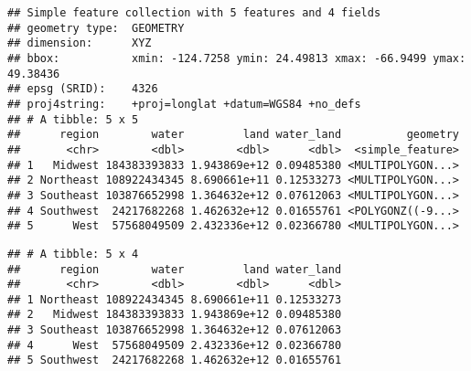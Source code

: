 \documentclass[]{book}
\newenvironment{Shaded}{\begin{snugshade}}{\end{snugshade}}
\newcommand{\KeywordTok}[1]{\textcolor[rgb]{0.13,0.29,0.53}{\textbf{{#1}}}}
\newcommand{\DataTypeTok}[1]{\textcolor[rgb]{0.13,0.29,0.53}{{#1}}}
\newcommand{\StringTok}[1]{\textcolor[rgb]{0.31,0.60,0.02}{{#1}}}
\newcommand{\CommentTok}[1]{\textcolor[rgb]{0.56,0.35,0.01}{\textit{{#1}}}}
\newcommand{\OtherTok}[1]{\textcolor[rgb]{0.56,0.35,0.01}{{#1}}}
\newcommand{\NormalTok}[1]{{#1}}
\begin{document}
\begin{Shaded}
\end{Shaded}

\begin{verbatim}
## Simple feature collection with 5 features and 4 fields
## geometry type:  GEOMETRY
## dimension:      XYZ
## bbox:           xmin: -124.7258 ymin: 24.49813 xmax: -66.9499 ymax: 49.38436
## epsg (SRID):    4326
## proj4string:    +proj=longlat +datum=WGS84 +no_defs
## # A tibble: 5 x 5
##      region        water         land water_land          geometry
##       <chr>        <dbl>        <dbl>      <dbl>  <simple_feature>
## 1   Midwest 184383393833 1.943869e+12 0.09485380 <MULTIPOLYGON...>
## 2 Northeast 108922434345 8.690661e+11 0.12533273 <MULTIPOLYGON...>
## 3 Southeast 103876652998 1.364632e+12 0.07612063 <MULTIPOLYGON...>
## 4 Southwest  24217682268 1.462632e+12 0.01655761 <POLYGONZ((-9...>
## 5      West  57568049509 2.432336e+12 0.02366780 <MULTIPOLYGON...>
\end{verbatim}

\begin{Shaded}
\end{Shaded}

\begin{verbatim}
## # A tibble: 5 x 4
##      region        water         land water_land
##       <chr>        <dbl>        <dbl>      <dbl>
## 1 Northeast 108922434345 8.690661e+11 0.12533273
## 2   Midwest 184383393833 1.943869e+12 0.09485380
## 3 Southeast 103876652998 1.364632e+12 0.07612063
## 4      West  57568049509 2.432336e+12 0.02366780
## 5 Southwest  24217682268 1.462632e+12 0.01655761
\end{verbatim}
\end{document}
